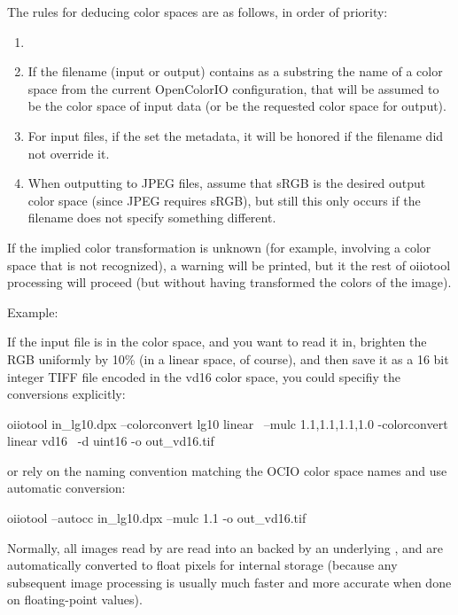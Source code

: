 The rules for deducing color spaces are as follows, in order of priority:

\begin{enumerate}
\item[]
\item If the filename (input or output) contains as a substring the name
  of a color space from the current OpenColorIO configuration, that will
  be assumed to be the color space of input data (or be the requested
  color space for output).
\item For input files, if the \ImageInput set the 
  metadata, it will be honored if the filename did not override it.
\item When outputting to JPEG files, assume that sRGB is the desired
  output color space (since JPEG requires sRGB), but still this only
  occurs if the filename does not specify something different.
\end{enumerate}

If the implied color transformation is unknown (for example, involving
a color space that is not recognized), a warning will be printed, but it
the rest of {\cf oiiotool} processing will proceed (but without having
transformed the colors of the image).

\noindent Example:

If the input file  is in the  color space,
and you want to read it in, brighten the RGB uniformly by 10\% (in a linear
space, of course), and then save it as a 16 bit integer TIFF file encoded
in the {\cf vd16} color space, you could specifiy the conversions
explicitly:

\begin{code}
  oiiotool in_lg10.dpx --colorconvert lg10 linear \
                       --mulc 1.1,1.1,1.1,1.0 -colorconvert linear vd16 \
                       -d uint16 -o out_vd16.tif
\end{code}

\noindent or rely on the naming convention matching the OCIO color space
names and use automatic conversion:

\begin{code}
  oiiotool --autocc in_lg10.dpx --mulc 1.1 -o out_vd16.tif
\end{code}

\apiend

Normally, all images read by \oiiotool are read into an \ImageBuf backed by
an underlying \ImageCache, and are automatically converted to {\cf float}
pixels for internal storage (because any subsequent image processing is
usually much faster and more accurate when done on floating-point values).

